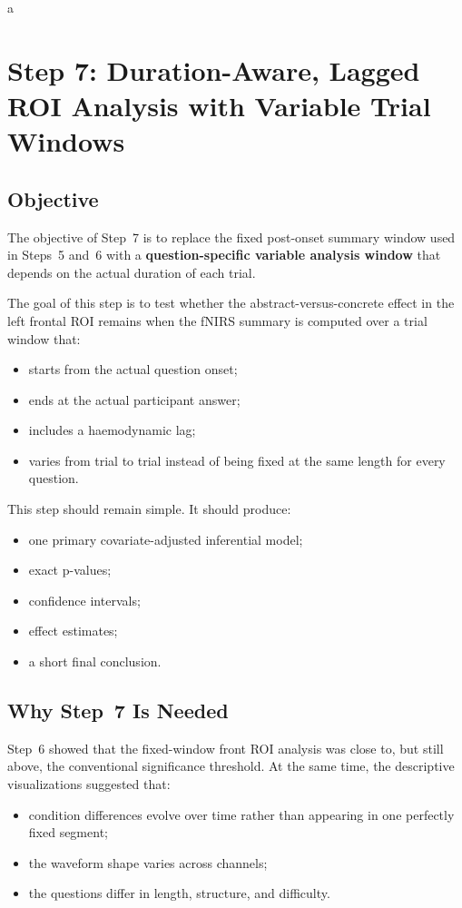 a\section{Step 7: Duration-Aware, Lagged ROI Analysis with Variable Trial Windows}
\label{sec:step7_variable_window}

\subsection{Objective}
The objective of Step~7 is to replace the fixed post-onset summary window used in Steps~5 and~6
with a \textbf{question-specific variable analysis window} that depends on the actual duration of each trial.

The goal of this step is to test whether the abstract-versus-concrete effect in the left frontal ROI
remains when the fNIRS summary is computed over a trial window that:
\begin{itemize}
    \item starts from the actual question onset;
    \item ends at the actual participant answer;
    \item includes a haemodynamic lag;
    \item varies from trial to trial instead of being fixed at the same length for every question.
\end{itemize}

This step should remain simple.
It should produce:
\begin{itemize}
    \item one primary covariate-adjusted inferential model;
    \item exact p-values;
    \item confidence intervals;
    \item effect estimates;
    \item a short final conclusion.
\end{itemize}

\subsection{Why Step~7 Is Needed}
Step~6 showed that the fixed-window front ROI analysis was close to, but still above, the conventional
significance threshold.
At the same time, the descriptive visualizations suggested that:
\begin{itemize}
    \item condition differences evolve over time rather than appearing in one perfectly fixed segment;
    \item the waveform shape varies across channels;
    \item the questions differ in length, structure, and difficulty.
\end{itemize}

